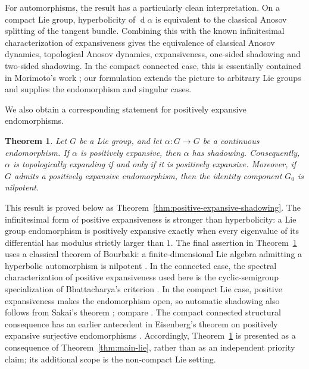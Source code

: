 \documentclass[12pt]{amsart}
\newtheorem{maintheorem}{Theorem}
\theoremstyle{definition}
\numberwithin{equation}{section}
\theoremstyle{remark}
\DeclareMathOperator{\di}{d}
\begin{document}
For automorphisms, the result has a particularly clean interpretation. On
a compact Lie group, hyperbolicity of $\di\alpha$ is equivalent to the
classical Anosov splitting of the tangent bundle. Combining this with the
known infinitesimal characterization of expansiveness gives the equivalence
of classical Anosov dynamics, topological Anosov dynamics, expansiveness,
one-sided shadowing and two-sided shadowing. In the compact connected case,
this is essentially contained in Morimoto's work
\cite{Morimoto1981}; our formulation extends the picture to arbitrary Lie
groups and supplies the endomorphism and singular cases.

We also obtain a corresponding statement for positively expansive
endomorphisms.

\begin{maintheorem}\label{thm:main-positive-expansive}
Let $G$ be a Lie group, and let $\alpha:G\to G$ be a continuous
endomorphism. If $\alpha$ is positively expansive, then $\alpha$ has
shadowing. Consequently, $\alpha$ is topologically expanding if and only if
it is positively expansive. Moreover, if $G$ admits a positively expansive
endomorphism, then the identity component $G_0$ is nilpotent.
\end{maintheorem}

This result is proved below as
Theorem~\ref{thm:positive-expansive-shadowing}. The infinitesimal form of
positive expansiveness is stronger than
hyperbolicity: a Lie group endomorphism is positively expansive exactly
when every eigenvalue of its differential has modulus strictly larger than
$1$. The final assertion in
Theorem~\ref{thm:main-positive-expansive} uses a classical theorem of
Bourbaki:
a finite-dimensional Lie algebra admitting a hyperbolic automorphism is
nilpotent \cite{BourbakiLie}. In the connected case, the spectral
characterization of positive expansiveness used here is the cyclic-semigroup
specialization of Bhattacharya's criterion
\cite[Theorem~A and Proposition~2.4]{Bhattacharya2004}. In the compact Lie
case, positive expansiveness makes the endomorphism open, so automatic
shadowing also follows from Sakai's theorem
\cite[Theorem~1]{Sakai2003}; compare \cite[Lemma~9]{Sakai2010}. The compact
connected structural consequence has an earlier antecedent in Eisenberg's
theorem on positively expansive surjective endomorphisms
\cite{EisenbergPositive1966}. Accordingly,
Theorem~\ref{thm:main-positive-expansive} is presented as a consequence of
Theorem~\ref{thm:main-lie}, rather than as an independent priority claim; its
additional scope is the non-compact Lie setting.
\end{document}
